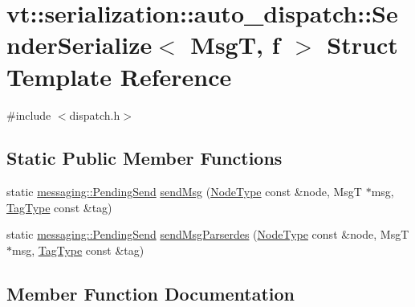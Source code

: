 \hypertarget{structvt_1_1serialization_1_1auto__dispatch_1_1_sender_serialize}{}\section{vt\+:\+:serialization\+:\+:auto\+\_\+dispatch\+:\+:Sender\+Serialize$<$ MsgT, f $>$ Struct Template Reference}
\label{structvt_1_1serialization_1_1auto__dispatch_1_1_sender_serialize}


{\ttfamily \#include $<$dispatch.\+h$>$}

\subsection*{Static Public Member Functions}
\begin{DoxyCompactItemize}
\item 
static \hyperlink{structvt_1_1messaging_1_1_pending_send}{messaging\+::\+Pending\+Send} \hyperlink{structvt_1_1serialization_1_1auto__dispatch_1_1_sender_serialize_a354ce918a8250c694d8d035d73e51dbd}{send\+Msg} (\hyperlink{namespacevt_a866da9d0efc19c0a1ce79e9e492f47e2}{Node\+Type} const \&node, MsgT $\ast$msg, \hyperlink{namespacevt_a84ab281dae04a52a4b243d6bf62d0e52}{Tag\+Type} const \&tag)
\item 
static \hyperlink{structvt_1_1messaging_1_1_pending_send}{messaging\+::\+Pending\+Send} \hyperlink{structvt_1_1serialization_1_1auto__dispatch_1_1_sender_serialize_aaca297ff56b6399da5cf29d74b623775}{send\+Msg\+Parserdes} (\hyperlink{namespacevt_a866da9d0efc19c0a1ce79e9e492f47e2}{Node\+Type} const \&node, MsgT $\ast$msg, \hyperlink{namespacevt_a84ab281dae04a52a4b243d6bf62d0e52}{Tag\+Type} const \&tag)
\end{DoxyCompactItemize}


\subsection{Member Function Documentation}
\mbox{\label{structvt_1_1serialization_1_1auto__dispatch_1_1_sender_serialize_a354ce918a8250c694d8d035d73e51dbd}} 
